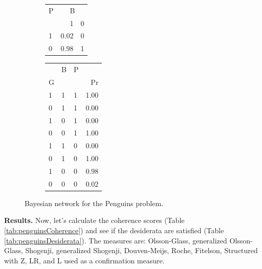 \documentclass[
  10pt,
]{scrartcl}
\begin{document}
\begin{figure}[H]
{\begin{subfigure}[!ht]{0.4\textwidth}
\begin{tabular}{lrr}
\toprule
\multicolumn{1}{c}{P} & \multicolumn{2}{c}{B} \\
  & 1 & 0\\
\midrule
1 & 0.02 & 0\\
0 & 0.98 & 1\\
\bottomrule
\end{tabular}


\begin{tabular}{lllr}
\toprule
\multicolumn{1}{c}{} & \multicolumn{1}{c}{B} & \multicolumn{1}{c}{P} & \multicolumn{1}{c}{} \\
G &  &  & Pr\\
\midrule
1 & 1 & 1 & 1.00\\
0 & 1 & 1 & 0.00\\
1 & 0 & 1 & 0.00\\
0 & 0 & 1 & 1.00\\
1 & 1 & 0 & 0.00\\
0 & 1 & 0 & 1.00\\
1 & 0 & 0 & 0.98\\
0 & 0 & 0 & 0.02\\
\bottomrule
\end{tabular}
\end{subfigure}}
\caption{Bayesian network for the Penguins problem.}
\label{fig:BGP}
\end{figure}


\noindent \textbf{Results.} Now, let's calculate the coherence scores (Table \ref{tab:penguinsCoherence}) and see if the desiderata are satisfied (Table \ref{tab:penguinsDesiderata}). The measures are: Olsson-Glass, generalized Olsson-Glass, Shogenji, generalized Shogenji, Douven-Meijs, Roche, Fitelson, Structured with Z, LR, and L used as a confirmation measure.
\end{document}
